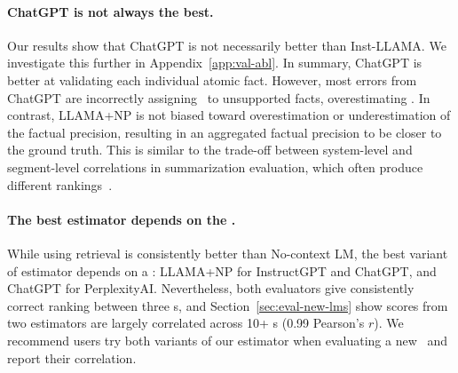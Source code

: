 \paragraph{ChatGPT is not always the best.}
Our results show that ChatGPT is not necessarily better than Inst-LLAMA. We investigate this further in Appendix~\ref{app:val-abl}. In summary, ChatGPT is better at validating each individual atomic fact. However, most errors from ChatGPT are incorrectly assigning \sLabel\ to unsupported facts, overestimating \ours.
In contrast, LLAMA+NP is not biased toward overestimation or underestimation of the factual precision, resulting in an aggregated factual precision to be closer to the ground truth.
This is similar to the trade-off between system-level and segment-level correlations in summarization evaluation, which often produce different rankings~\citep{bhandari-etal-2020-evaluating,deutsch2021towards}.

\vspace{-.3em}
\paragraph{The best estimator depends on the \subjectLM.}
While using retrieval is consistently better than No-context LM, the best variant of estimator depends on a \subjectLM: LLAMA+NP for InstructGPT and ChatGPT, and ChatGPT for PerplexityAI. 
%
Nevertheless, both evaluators give consistently correct ranking between three \subjectLM{}s, and Section~\ref{sec:eval-new-lms} show scores from two estimators are largely correlated across 10+ \subjectLM{}s (0.99 Pearson's $r$). We recommend users try both variants of our estimator when evaluating a new \subjectLM\ and report their correlation. %






